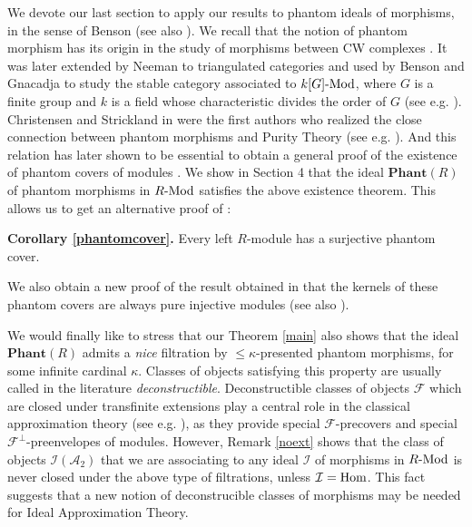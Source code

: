 \documentclass[11pt]{amsart}
\begin{document}
{We devote our last section to apply our results to  phantom ideals of morphisms, in the sense of Benson \cite{Be} (see also \cite{Gna, Herzog1}). We recall that the notion of phantom morphism has its origin in the study of morphisms between CW complexes \cite{MG}. It was later extended  by Neeman \cite{Neeman} to triangulated categories and used by Benson and Gnacadja to study the stable category associated to $k[G]{\textrm{-}{\rm Mod}}$, where $G$ is a finite group and $k$ is a field whose characteristic divides the order of $G$ (see e.g. \cite{Be, Gna}). Christensen and Strickland in \cite{CS} were the first authors who realized the close connection between phantom morphisms and Purity Theory (see e.g. \cite{C}). And this relation has later shown to be essential to obtain a general proof of the existence of phantom covers of modules \cite{Herzog1,Herzog2}. We show in Section 4 that the ideal ${\mathbf{Phant}(R)}$ of phantom morphisms in $R{\textrm{-}{\rm Mod}}$  satisfies the above existence theorem. This allows us to get an alternative proof of \cite[Theorem 7]{Herzog1}:

\medskip\par\noindent
{\bf Corollary \ref{phantomcover}.} Every left $R$-module has a surjective phantom cover.
\smallskip

We also obtain  a new proof of the result obtained in \cite{Herzog1} that the kernels of these phantom covers are always pure injective modules (see also \cite{Herzog2}).

We would finally like to stress that our Theorem \ref{main} also shows that the ideal ${\mathbf{Phant}(R)}$ admits a {\em nice} filtration by $\leq \kappa$-presented phantom morphisms, for some infinite cardinal $\kappa$. Classes of objects satisfying this property are usually called in the literature \emph{deconstructible}. Deconstructible classes of objects $\mathcal F$ which are closed under transfinite extensions play a central role in the classical approximation theory (see e.g. \cite{S,Tr}), as they provide special $\mathcal F$-precovers and special $\mathcal F^{\perp}$-preenvelopes of modules. However, Remark \ref{noext} shows that the class of objects ${\mathcal I(\mathcal A_2)}$ that we are associating to any ideal $\mathcal I$ of morphisms in $R{\textrm{-}{\rm Mod}}$ is never closed under the above type of filtrations, unless $\mathcal I={\mathop{\rm Hom}\nolimits}$. This fact suggests that a new notion of deconstrucible classes of morphisms may be needed for Ideal Approximation Theory.

}
\end{document}
